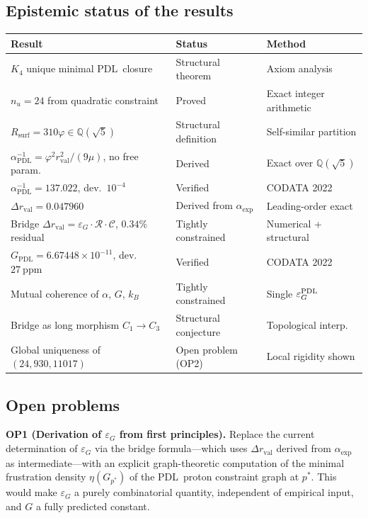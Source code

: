 \documentclass[11pt,a4paper]{article}
\theoremstyle{definition}
\newcommand{\PDL}{\textnormal{PDL}}
\newcommand{\Rsurf}{R_{\mathrm{surf}}}
\newcommand{\rval}{r_{\mathrm{val}}}
\newcommand{\epsg}{\varepsilon_G}
\newcommand{\alphaPDL}{\alpha_{\mathrm{PDL}}}
\newcommand{\GPDL}{G_{\mathrm{PDL}}}
\newcommand{\calR}{\mathcal{R}}
\newcommand{\calC}{\mathcal{C}}
\newcommand{\vp}{\varphi}
\newcommand{\drval}{\Delta r_{\mathrm{val}}}
\begin{document}
\subsection{Epistemic status of the results}
\label{subsec:status}

\begin{center}
\begin{tabular}{lll}
\toprule
Result & Status & Method \\
\midrule
$K_4$ unique minimal \PDL\ closure & Structural theorem & Axiom analysis \\ $n_u = 24$ from quadratic constraint & Proved & Exact integer arithmetic \\ $\Rsurf = 310\vp \in \mathbb{Q}(\sqrt{5})$ & Structural definition & Self-similar partition \\ $\alphaPDL^{-1} = \vp^2\rval^2/(9\mu)$, no free param. & Derived & Exact over $\mathbb{Q}(\sqrt{5})$ \\ $\alphaPDL^{-1} = 137.022$, dev.\ $10^{-4}$ & Verified & CODATA 2022 \\ $\drval = 0.047960$ & Derived from $\alpha_{\mathrm{exp}}$ & Leading-order exact \\ Bridge $\drval = \epsg\cdot\calR\cdot\calC$, $0.34\%$ residual & Tightly constrained & Numerical + structural \\ $\GPDL = 6.67448\times10^{-11}$, dev.\ $27\ \mathrm{ppm}$ & Verified & CODATA 2022 \\ Mutual coherence of $\alpha$, $G$, $k_B$ & Tightly constrained & Single $\epsg^{\PDL}$ \\ Bridge as long morphism $C_1 \to C_3$ & Structural conjecture & Topological interp. \\ Global uniqueness of $(24, 930, 11017)$ & Open problem (OP2) & Local rigidity shown \\
\bottomrule
\end{tabular}
\end{center}

\subsection{Open problems}
\label{subsec:open}

\medskip\noindent\textbf{OP1 (Derivation of $\epsg$ from first principles).} Replace the current determination of $\epsg$ via the bridge formula---which uses $\drval$ derived from $\alpha_{\mathrm{exp}}$ as intermediate---with an explicit graph-theoretic computation of the minimal frustration density $\eta(G_{p^*})$ of the \PDL\ proton constraint graph at $p^*$. This would make $\epsg$ a purely combinatorial quantity, independent of empirical input, and $G$ a fully predicted constant.
\end{document}
